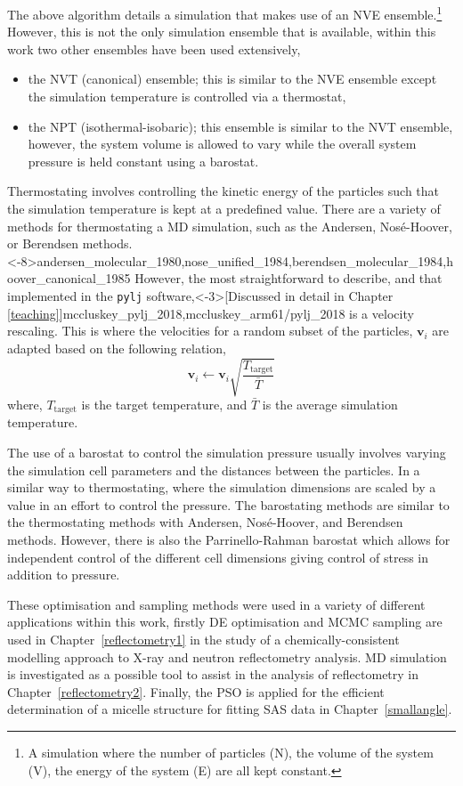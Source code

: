 The above algorithm details a simulation that makes use of an NVE ensemble.\footnote{A simulation where the number of particles (N), the volume of the system (V), the energy of the system (E) are all kept constant.}
However, this is not the only simulation ensemble that is available, within this work two other ensembles have been used extensively,
%
\begin{itemize}
\item the NVT (canonical) ensemble; this is similar to the NVE ensemble except the simulation temperature is controlled via a thermostat,
\item the NPT (isothermal-isobaric); this ensemble is similar to the NVT ensemble, however, the system volume is allowed to vary while the overall system pressure is held constant using a barostat.
\end{itemize}
%
Thermostating involves controlling the kinetic energy of the particles such that the simulation temperature is kept at a predefined value.
There are a variety of methods for thermostating a MD simulation, such as the Andersen, Nos\'{e}-Hoover, or Berendsen methods.\sidecite<-8\baselineskip>{andersen_molecular_1980,nose_unified_1984,berendsen_molecular_1984,hoover_canonical_1985}
However, the most straightforward to describe, and that implemented in the \texttt{pylj} software,\sidecite<-3\baselineskip>[Discussed in detail in Chapter \ref{teaching}]{mccluskey_pylj_2018,mccluskey_arm61/pylj_2018} is a velocity rescaling.\autocite{bussi_canonical_2007}
This is where the velocities for a random subset of the particles, $\mathbf{v}_i$ are adapted based on the following relation,
%
\begin{equation}
\mathbf{v}_i \leftarrow \mathbf{v}_i \sqrt{\frac{T_{\text{target}}}{\bar{T}}}
\end{equation}
%
where, $T_{\text{target}}$ is the target temperature, and $\bar{T}$ is the average simulation temperature.

The use of a barostat to control the simulation pressure usually involves varying the simulation cell parameters and the distances between the particles.
In a similar way to thermostating, where the simulation dimensions are scaled by a value in an effort to control the pressure.
The barostating methods are similar to the thermostating methods with Andersen, Nos\'{e}-Hoover, and Berendsen methods.
However, there is also the Parrinello-Rahman barostat which allows for independent control of the different cell dimensions giving control of stress in addition to pressure.\autocite{parrinello_polymorphic_1981}

These optimisation and sampling methods were used in a variety of different applications within this work, firstly DE optimisation and MCMC sampling are used in Chapter~\ref{reflectometry1} in the study of a chemically-consistent modelling approach to X-ray and neutron reflectometry analysis.
MD simulation is investigated as a possible tool to assist in the analysis of reflectometry in Chapter~\ref{reflectometry2}.
Finally, the PSO is applied for the efficient determination of a micelle structure for fitting SAS data in Chapter~\ref{smallangle}.

